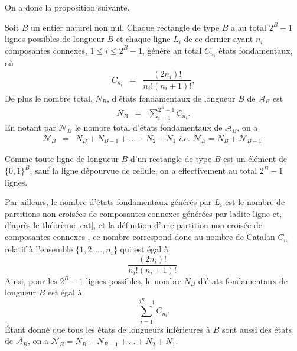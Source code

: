 On a donc la proposition suivante.
\begin{Prop}\label{prop11}
Soit $B$ un entier naturel non nul. Chaque rectangle de type $B$  a au total $2^{B}-1$ lignes possibles de longueur $B$ et chaque ligne $L_{i}$ de ce dernier ayant $n_{i}$ composantes connexes, $1\leq i\leq 2^{B}-1$,
génère au total $C_{n_{i}}$ états fondamentaux, où
\begin{eqnarray}\label{for5}
 C_{n_{i}} &=& \dfrac{(2n_{i})!}{n_{i}!(n_{i}+1)!},  
\end{eqnarray}
De plus le nombre total, $N_{B}$, d'états fondamentaux de longueur $B$ de $\mathcal{A}_{B}$ est 
\begin{eqnarray}\label{for6}
N_{B} & = & \sum_{i=1}^{2^{B}-1}C_{n_{i}}.
\end{eqnarray}
En notant par $\mathcal{N}_{B}$ le nombre total d'états fondamentaux de $\mathcal{A}_{B}$, on a 
\begin{eqnarray}\label{for7}
\mathcal{N}_{B} & = & N_{B} + N_{B-1}+...+N_{2} + N_{1} \textit{  i.e.  } \mathcal{N}_{B} = N_{B} + \mathcal{N}_{B-1}.
\end{eqnarray}
\end{Prop}
\begin{Pre}
Comme toute ligne de longueur $B$ d'un rectangle de type $B$ est un élément de $\{0,1\}^{B}$, sauf la ligne dépourvue de cellule, on a effectivement au total $2^{B}-1$ lignes. 

Par ailleurs, le nombre d'états fondamentaux générés par $L_{i}$ est  le nombre de partitions non croisées de composantes connexes  générées par ladite ligne et, d'après le théorème \ref{cat}, et la définition  d'une partition non croisée de composantes connexes  , ce nombre correspond donc au nombre de Catalan $C_{n_{i}}$ relatif  à  l'ensemble $\{1,2,...,n_{i}\}$ qui est égal à $$ \dfrac{(2n_{i})!}{n_{i}!(n_{i}+1)!}. $$
Ainsi, pour les  $2^{B}-1$ lignes possibles, le nombre $N_{B}$ d'états fondamentaux de longueur $B$ est égal à
$$\sum_{i=1}^{ 2^{B}-1}C_{n_{i}}.$$
Étant donné que tous les états de longueurs inférieures à $B$ sont aussi des états de $\mathcal{A}_{B}$, on a $\mathcal{N}_{B}  =  N_{B} + N_{B-1}+...+N_{2} + N_{1}$.
\end{Pre}
